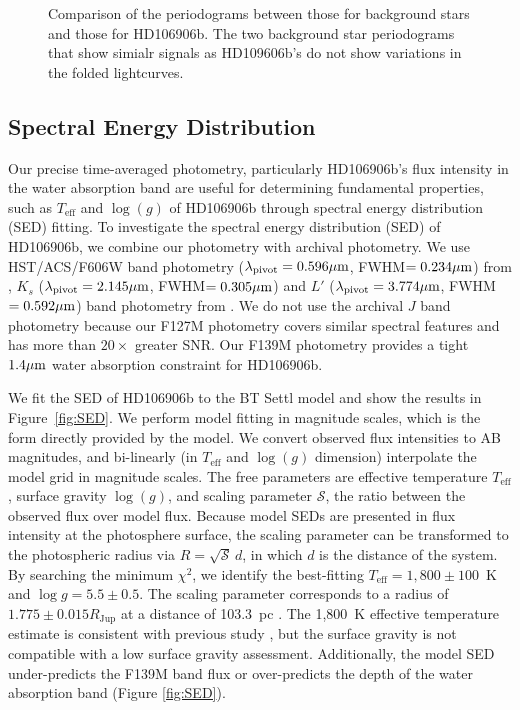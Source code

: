 \documentclass[twocolumn]{aastex62}
\newcommand{\teff}{\ensuremath{T_{\mathrm{eff}}}\xspace}
\newcommand{\logg}{\ensuremath{\log(g)}\xspace}
\begin{document}
\begin{figure}
  \centering
  \caption{Comparison of the periodograms between those for background stars and those for HD106906b. The two background star periodograms that show simialr signals as HD109606b's do not show variations in the folded lightcurves.}
  \label{fig:all-periodograms}
\end{figure}


\subsection{Spectral Energy Distribution}
Our precise time-averaged photometry, particularly HD106906b's flux intensity in the water absorption band are useful for determining fundamental properties, such as \teff{} and \logg{} of HD106906b through spectral energy distribution (SED) fitting.  To investigate the spectral energy distribution (SED) of HD106906b, we combine our photometry with archival photometry.  We use HST/ACS/F606W band photometry ($\lambda_{\mathrm{pivot}}=0.596\mbox{$\mu$m}$, FWHM$=0.234\mbox{$\mu$m}$) from \citet{Kalas2015}, $K_{s}$ ($\lambda_{\mathrm{pivot}}=2.145\mbox{$\mu$m}$, FWHM$=0.305\mbox{$\mu$m}$) and $L'$ ($\lambda_{\mathrm{pivot}}=3.774\mbox{$\mu$m}$, FWHM$=0.592\mbox{$\mu$m}$) band photometry from \citet{Bailey2013}. We do not use the archival $J$ band photometry \citep{Wu2016} because our F127M photometry covers similar spectral features and has more than $20\times$ greater SNR. Our F139M photometry provides a tight $1.4\mbox{$\mu$m}$ water absorption constraint for HD106906b.

We fit the SED of HD106906b to the BT Settl model \citep[][]{Allard2012} and show the results in Figure~\ref{fig:SED}. We perform model fitting in magnitude scales, which is the form directly provided by the model.  We convert observed flux intensities to AB magnitudes, and bi-linearly (in \teff and \logg dimension) interpolate the model grid in magnitude scales. The free parameters are effective temperature $\teff$, surface gravity $\logg$, and scaling parameter $\mathcal{S}$, the ratio between the observed flux over model flux. Because model SEDs are presented in flux intensity at the photosphere surface, the scaling parameter can be transformed to the photospheric radius via $R=\sqrt{\mathcal{S}}\,d$, in which $d$ is the distance of the system. By searching the minimum $\chi^{2}$, we identify the best-fitting $T_{\mathrm{eff}}=1,800\pm100$~K and $\log g=5.5\pm0.5$.  The scaling parameter corresponds to a radius of  $1.775\pm0.015R_{\mathrm{Jup}}$ at a distance of 103.3~pc \citep{Gaia2018,Gaia2016}. The 1,800~K effective temperature estimate is consistent with previous study \citep{Bailey2013,Wu2016}, but the surface gravity is not compatible with a low surface gravity assessment. Additionally, the model SED under-predicts the F139M band flux or over-predicts the depth of the water absorption band (Figure \ref{fig:SED}).
\end{document}
